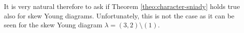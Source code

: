 \documentclass[12pt]{amsart}
\theoremstyle{plain}
\theoremstyle{remark}
\DeclareMathOperator{\Tr}{Tr}
\begin{document}

It is very natural therefore to ask if Theorem \ref{theo:character-sniady} holds true
also for skew Young diagrams. Unfortunately, this is not the case as it can be seen
for the skew Young diagram $\lambda=(3,2) \setminus (1)$.



\end{document}
